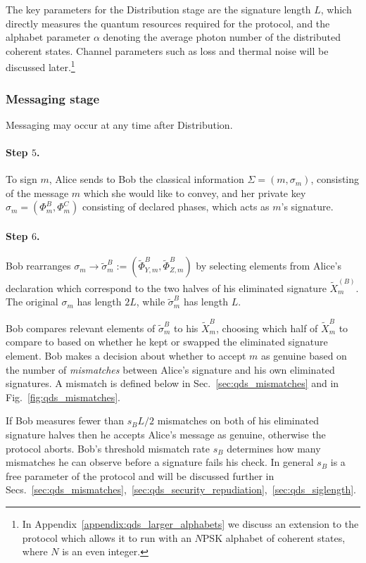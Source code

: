 The key parameters for the Distribution stage are the signature length $L$, which directly measures the quantum resources required for the protocol, and the alphabet parameter $\alpha$ denoting the average photon number of the distributed coherent states. Channel parameters such as loss and thermal noise will be discussed later.\footnote{In Appendix~\ref{appendix:qds_larger_alphabets} we discuss an extension to the protocol which allows it to run with an $N$PSK alphabet of coherent states, where $N$ is an even integer.}

\subsubsection{Messaging stage}

Messaging may occur at any time after Distribution.

\paragraph{Step $5$.}
To sign $m$, Alice sends to Bob the classical information $\Sigma = \left(m, \sigma_m\right)$, consisting of the message $m$ which she would like to convey, and her private key $\sigma_m = \left(\Phi_m^B, \Phi_m^C\right)$ consisting of declared phases, which acts as $m$'s signature. 


\paragraph{Step $6$.} Bob rearranges $\sigma_m \rightarrow \tilde{\sigma}_m^B := \left(\tilde{\Phi}_{Y, m}^B, \tilde{\Phi}_{Z, m}^B\right)$ by selecting elements from Alice's declaration which correspond to the two halves of his eliminated signature $\tilde{X}_m^{\left(B\right)}$. The original $\sigma_m$ has length $2 L$, while $\tilde{\sigma}_m^B$ has length $L$.

Bob compares relevant elements of $\tilde{\sigma}_m^B$ to his $\tilde{X}_m^{B}$, choosing which half of $\tilde{X}_m^B$ to compare to based on whether he kept or swapped the eliminated signature element. Bob makes a decision about whether to accept $m$ as genuine based on the number of \emph{mismatches} between Alice's signature and his own eliminated signatures. A mismatch is defined below in Sec.~\ref{sec:qds_mismatches} and in Fig.~\ref{fig:qds_mismatches}.


If Bob measures fewer than $s_B L/2$ mismatches on both of his eliminated signature halves then he accepts Alice's message as genuine, otherwise the protocol aborts. Bob's threshold mismatch rate $s_B$ determines how many mismatches he can observe before a signature fails his check. In general $s_B$ is a free parameter of the protocol and will be discussed further in Secs.~\ref{sec:qds_mismatches},~\ref{sec:qds_security_repudiation},~\ref{sec:qds_siglength}.


